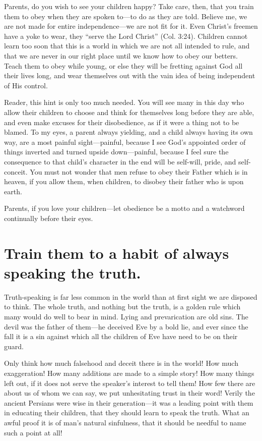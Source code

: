 \documentclass[
]{book}
\begin{document}
Parents, do you wish to see your children happy? Take care, then, that you train them to obey when they are spoken to---to do as they are told. Believe me, we are not made for entire independence---we are not fit for it. Even Christ's freemen have a yoke to wear, they ``serve the Lord Christ'' (Col. 3:24). Children cannot learn too soon that this is a world in which we are not all intended to rule, and that we are never in our right place until we know how to obey our betters. Teach them to obey while young, or else they will be fretting against God all their lives long, and wear themselves out with the vain idea of being independent of His control.

Reader, this hint is only too much needed. You will see many in this day who allow their children to choose and think for themselves long before they are able, and even make excuses for their disobedience, as if it were a thing not to be blamed. To my eyes, a parent always yielding, and a child always having its own way, are a most painful sight---painful, because I see God's appointed order of things inverted and turned upside down---painful, because I feel sure the consequence to that child's character in the end will be self-will, pride, and self-conceit. You must not wonder that men refuse to obey their Father which is in heaven, if you allow them, when children, to disobey their father who is upon earth.

Parents, if you love your children---let obedience be a motto and a watchword continually before their eyes.

\hypertarget{train-them-to-a-habit-of-always-speaking-the-truth.}{%
\chapter{Train them to a habit of always speaking the truth.}\label{train-them-to-a-habit-of-always-speaking-the-truth.}}

Truth-speaking is far less common in the world than at first sight we are disposed to think. The whole truth, and nothing but the truth, is a golden rule which many would do well to bear in mind. Lying and prevarication are old sins. The devil was the father of them---he deceived Eve by a bold lie, and ever since the fall it is a sin against which all the children of Eve have need to be on their guard.

Only think how much falsehood and deceit there is in the world! How much exaggeration! How many additions are made to a simple story! How many things left out, if it does not serve the speaker's interest to tell them! How few there are about us of whom we can say, we put unhesitating trust in their word! Verily the ancient Persians were wise in their generation---it was a leading point with them in educating their children, that they should learn to speak the truth. What an awful proof it is of man's natural sinfulness, that it should be needful to name such a point at all!
\end{document}
